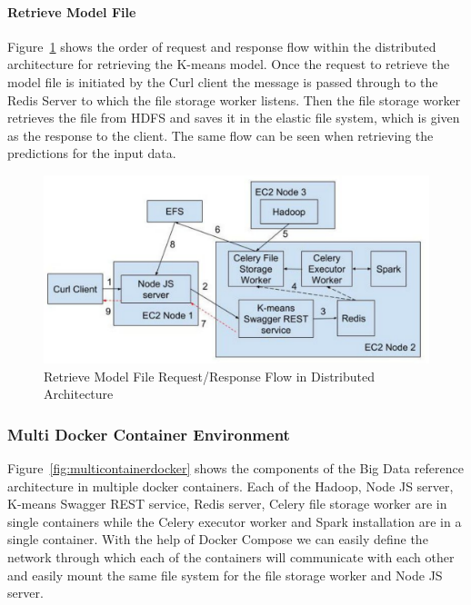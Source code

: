 \paragraph{Retrieve Model File}

Figure~\ref{fig:retrievemodelfiledistributed} shows the order of request and 
response flow within the distributed architecture for retrieving the K-means 
model. Once the request to retrieve the model file is initiated by the Curl 
client the message is passed through to the Redis Server to which the file 
storage worker listens. Then the file storage worker retrieves the file from 
HDFS and saves it in the elastic file system, which is given as the response 
to the client. The same flow can be seen when retrieving the predictions for 
the input data. 

\begin{figure}[htbp] 
	\centering
	\includegraphics[width=\columnwidth]{images/ec2getkmeansmodel.pdf}
	\caption{Retrieve Model File Request/Response Flow in Distributed 
	Architecture}
\label{fig:retrievemodelfiledistributed} 
\end{figure}

\subsubsection{Multi Docker Container Environment}

Figure~\ref{fig:multicontainerdocker} shows the components of the Big Data 
reference architecture in multiple docker containers. Each of the Hadoop, Node 
JS server, K-means Swagger REST service, Redis server, Celery file storage 
worker are in single containers while the Celery executor worker and Spark 
installation are in a single container. With the help of Docker Compose we can 
easily define the network through which each of the containers will 
communicate with each other and easily mount the same file system for the file 
storage worker and Node JS server. 

